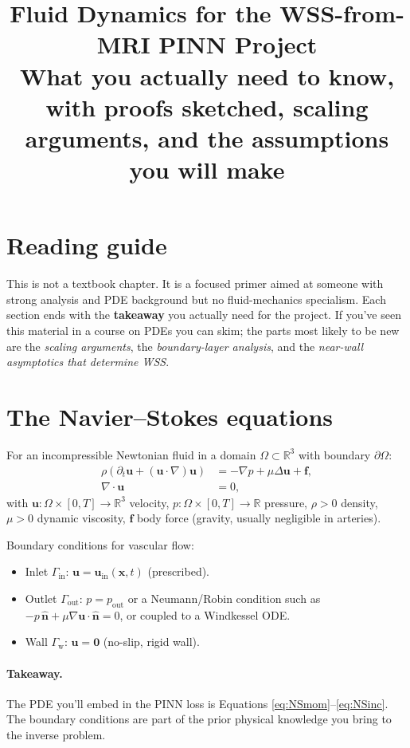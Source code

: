 \documentclass[11pt]{article}
\title{\bfseries Fluid Dynamics for the WSS-from-MRI PINN Project\\[0.3em]
\large What you actually need to know, with proofs sketched, scaling arguments, and the assumptions you will make}
\author{}
\date{}
\begin{document}
\maketitle

\section*{Reading guide}
This is not a textbook chapter. It is a focused primer aimed at someone with strong analysis and PDE background but no fluid-mechanics specialism. Each section ends with the \textbf{takeaway} you actually need for the project. If you've seen this material in a course on PDEs you can skim; the parts most likely to be new are the \emph{scaling arguments}, the \emph{boundary-layer analysis}, and the \emph{near-wall asymptotics that determine WSS}.

\section{The Navier--Stokes equations}

For an incompressible Newtonian fluid in a domain $\Omega \subset \mathbb{R}^3$ with boundary $\partial\Omega$:
\begin{align}
\rho\!\left(\partial_t \mathbf{u} + (\mathbf{u}\cdot\nabla)\mathbf{u}\right) &= -\nabla p + \mu \Delta \mathbf{u} + \mathbf{f}, \label{eq:NSmom}\\
\nabla\cdot\mathbf{u} &= 0, \label{eq:NSinc}
\end{align}
with $\mathbf{u}: \Omega \times [0,T] \to \mathbb{R}^3$ velocity, $p: \Omega \times [0,T] \to \mathbb{R}$ pressure, $\rho > 0$ density, $\mu > 0$ dynamic viscosity, $\mathbf{f}$ body force (gravity, usually negligible in arteries).

Boundary conditions for vascular flow:
\begin{itemize}[noitemsep]
\item Inlet $\Gamma_{\text{in}}$: $\mathbf{u} = \mathbf{u}_{\text{in}}(\mathbf{x},t)$ (prescribed).
\item Outlet $\Gamma_{\text{out}}$: $p = p_{\text{out}}$ or a Neumann/Robin condition such as $-p\,\hat{\mathbf{n}} + \mu \nabla\mathbf{u}\cdot\hat{\mathbf{n}} = 0$, or coupled to a Windkessel ODE.
\item Wall $\Gamma_{\text{w}}$: $\mathbf{u} = \mathbf{0}$ (no-slip, rigid wall).
\end{itemize}

\paragraph{Takeaway.} The PDE you'll embed in the PINN loss is Equations \eqref{eq:NSmom}--\eqref{eq:NSinc}. The boundary conditions are part of the prior physical knowledge you bring to the inverse problem.
\end{document}
